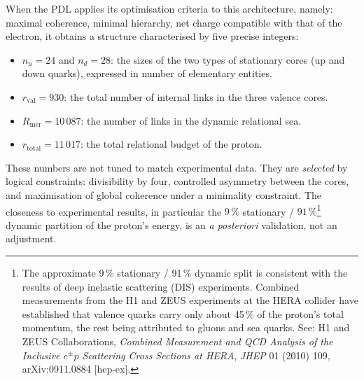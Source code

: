 \documentclass[12pt, a4paper, openright]{book}
\begin{document}
When the PDL applies its optimisation criteria to this architecture, namely: maximal coherence, minimal hierarchy, net charge compatible with that of the electron, it obtains a structure characterised by five precise integers:

\begin{itemize}
\item $n_u = 24$ and $n_d = 28$: the sizes of the two types of stationary cores (up and down quarks), expressed in number of elementary entities.
\item $r_{\text{val}} = 930$: the total number of internal links in the three valence cores.
\item $R_{\text{mer}} = 10\,087$: the number of links in the dynamic relational sea.
\item $r_{\text{total}} = 11\,017$: the total relational budget of the proton.
\end{itemize}

These numbers are not tuned to match experimental data. They are \emph{selected} by logical constraints: divisibility by four, controlled asymmetry between the cores, and maximisation of global coherence under a minimality constraint. The closeness to experimental results, in particular the $9\,\%$ stationary / $91\,\%$\footnote{The approximate 9\,\% stationary / 91\,\% dynamic split is consistent with the results of deep inelastic scattering (DIS) experiments. Combined measurements from the H1 and ZEUS experiments at the HERA collider have established that valence quarks carry only about 45\,\% of the proton's total momentum, the rest being attributed to gluons and sea quarks. See: H1 and ZEUS Collaborations, \textit{Combined Measurement and QCD Analysis of the Inclusive $e^{\pm}p$ Scattering Cross Sections at HERA}, \textit{JHEP} 01 (2010) 109, arXiv:0911.0884 [hep-ex].} dynamic partition of the proton's energy, is an \emph{a posteriori} validation, not an adjustment.

\medskip
\end{document}
